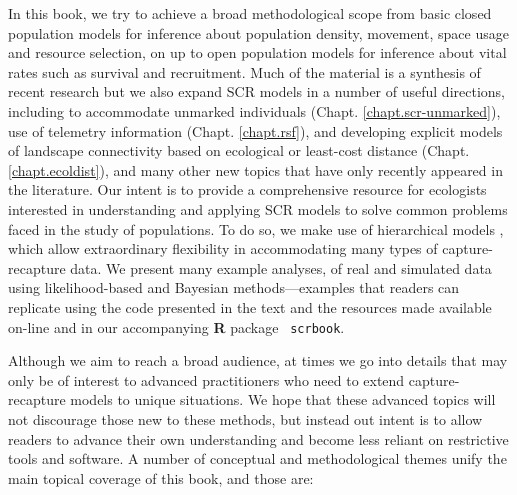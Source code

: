 In this book, we try to achieve a broad methodological scope from
basic closed population models %
for inference about population density, movement, space usage and resource
selection, on up to open population models for inference about vital
rates such as survival and recruitment. %
Much of the material is a synthesis of recent research but we also
expand SCR models in a number of useful directions, including to
accommodate unmarked individuals (Chapt. \ref{chapt.scr-unmarked}),
use of telemetry information (Chapt. \ref{chapt.rsf}), and developing
explicit models of landscape connectivity based on ecological or
least-cost distance (Chapt. \ref{chapt.ecoldist}), and many other new
topics that have only recently appeared in the literature.  Our intent
is to provide a comprehensive resource for ecologists interested in
understanding and applying SCR models to solve common problems faced
in the study of populations.  To do so, we make use of hierarchical
models \citep{royle_dorazio:2008}, which allow extraordinary
flexibility in accommodating many types of capture-recapture data. We
present many example analyses, of real and simulated data using
likelihood-based and Bayesian methods---examples that readers can
replicate using the code presented in the text and the resources made
available on-line and in our accompanying {\bf R} package {\tt
  scrbook}.

Although we aim to reach a broad audience, at times we go into details
that may only be of interest to advanced practitioners who need to
extend capture-recapture models to unique situations.  We hope that
these advanced topics will not discourage those new to these methods,
but instead out intent is to allow readers to advance their own
understanding and become less reliant on restrictive tools and
software.
A number of conceptual and methodological
themes unify the main topical coverage of this book, and those are:

